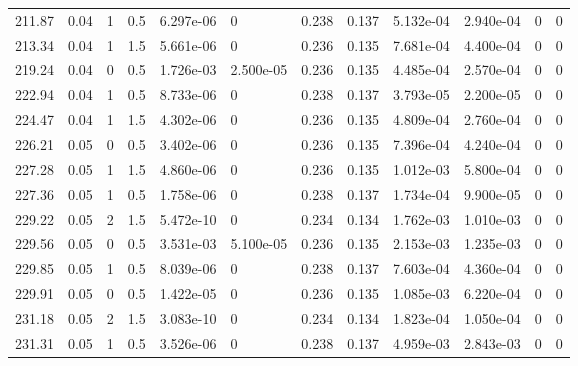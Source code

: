 \documentclass[preview]{standalone}
\begin{document}
{{{\begin{tabular}{L{1.2cm}C{1.2cm} C{0.3cm}C{0.5cm} C{1.4cm}C{1.4cm} C{1.4cm}C{1.4cm} C{1.6cm}C{1.6cm} C{1.6cm}C{1.6cm}}
  211.87  &  0.04  & 1     & 0.5 &  6.297e-06  & 0  &  0.238&   0.137& 5.132e-04 & 2.940e-04   &  0 & 0  \\ 
  213.34  &  0.04  & 1     & 1.5 &  5.661e-06  & 0  &  0.236&   0.135& 7.681e-04 & 4.400e-04   &  0 & 0  \\ 
  219.24  &  0.04  & 0     & 0.5 &  1.726e-03  & 2.500e-05  &  0.236&   0.135& 4.485e-04 & 2.570e-04   &  0 & 0  \\ 
  222.94  &  0.04  & 1     & 0.5 &  8.733e-06  & 0  &  0.238&   0.137& 3.793e-05 & 2.200e-05   &  0 & 0  \\ 
  224.47  &  0.04  & 1     & 1.5 &  4.302e-06  & 0  &  0.236&   0.135& 4.809e-04 & 2.760e-04   &  0 & 0  \\ 
  226.21  &  0.05  & 0     & 0.5 &  3.402e-06  & 0  &  0.236&   0.135& 7.396e-04 & 4.240e-04   &  0 & 0  \\ 
  227.28  &  0.05  & 1     & 1.5 &  4.860e-06  & 0  &  0.236&   0.135& 1.012e-03 & 5.800e-04   &  0 & 0  \\ 
  227.36  &  0.05  & 1     & 0.5 &  1.758e-06  & 0  &  0.238&   0.137& 1.734e-04 & 9.900e-05   &  0 & 0  \\ 
  229.22  &  0.05  & 2     & 1.5 &  5.472e-10  & 0  &  0.234&   0.134& 1.762e-03 & 1.010e-03   &  0 & 0  \\ 
  229.56  &  0.05  & 0     & 0.5 &  3.531e-03  & 5.100e-05  &  0.236&   0.135& 2.153e-03 & 1.235e-03   &  0 & 0  \\ 
  229.85  &  0.05  & 1     & 0.5 &  8.039e-06  & 0  &  0.238&   0.137& 7.603e-04 & 4.360e-04   &  0 & 0  \\ 
  229.91  &  0.05  & 0     & 0.5 &  1.422e-05  & 0  &  0.236&   0.135& 1.085e-03 & 6.220e-04   &  0 & 0  \\ 
  231.18  &  0.05  & 2     & 1.5 &  3.083e-10  & 0  &  0.234&   0.134& 1.823e-04 & 1.050e-04   &  0 & 0  \\ 
  231.31  &  0.05  & 1     & 0.5 &  3.526e-06  & 0  &  0.238&   0.137& 4.959e-03 & 2.843e-03   &  0 & 0  \\ 
\hline 
\end{tabular} 

}}}
\end{document}
